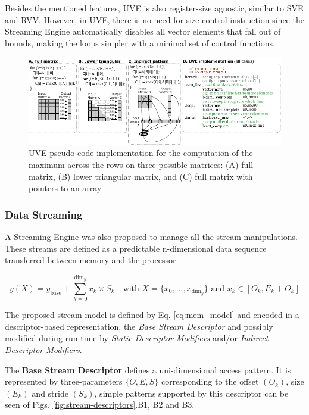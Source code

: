 Besides the mentioned features, UVE is also register-size agnostic, similar to SVE and RVV. However, in UVE, there is no need for size control instruction since the Streaming Engine automatically disables all vector elements that fall out of bounds, making the loops simpler with a minimal set of control functions.


\begin{figure}[H]
	\begin{center}
 		\includegraphics[width=\linewidth]{images/UVE-pseudo-code.pdf}
 		\caption{UVE pseudo-code implementation for the computation of the maximum
across the rows on three possible matrices: (A) full matrix, (B) lower triangular
matrix, and (C) full matrix with pointers to an array}
 		\label{fig:uve-mem-access}
	\end{center} 
\end{figure}

\subsubsection{Data Streaming}

A Streaming Engine was also proposed to manage all the stream manipulations.
These streams are defined as a predictable n-dimensional data sequence transferred between memory and the processor.


\begin{equation}
    y(X) = y_{\text{base}} + \sum_{k=0}^{\text{dim}_y} x_k \times S_k
    \quad \text{with } X = \{x_0, \ldots, x_{\text{dim}_y}\} \text{ and } x_k \in [O_k, E_k+O_k]
    \label{eq:mem_model}
\end{equation}

The proposed stream model is defined by Eq. \ref{eq:mem_model} and encoded in a descriptor-based representation, the \textit{Base Stream Descriptor} and possibly modified during run time by \textit{Static Descriptor Modifiers} and/or \textit{Indirect Descriptor Modifiers}.

The \textbf{Base Stream Descriptor} defines a uni-dimensional access pattern. It is represented by three-parameters $\{O, E, S\}$ corresponding to the offset $(O_k)$, size $(E_k)$ and stride $(S_k)$, simple patterns supported by this descriptor can be seen of Figs. \ref{fig:stream-descriptors}.B1, B2 and B3.

